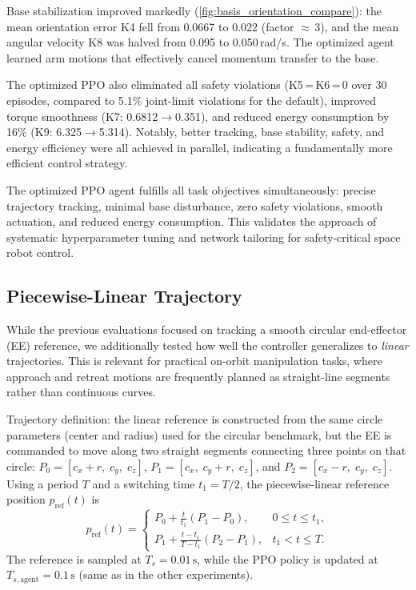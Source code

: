 \documentclass{ieeeaccess}
\begin{document}
Base stabilization improved markedly (\autoref{fig:basis_orientation_compare}): the mean orientation error K4 fell from 0.0667 to 0.022 (factor $\approx$\,3), 
and the mean angular velocity K8 was halved from 0.095 to 0.050\,rad/s. The optimized agent learned arm motions that effectively cancel momentum transfer to the base.

The optimized PPO also eliminated all safety violations (K5\,=\,K6\,=\,0 over 30 episodes, compared to 5.1\% joint-limit violations for the default), 
improved torque smoothness (K7: 0.6812$\to$0.351), and reduced energy consumption by 16\% (K9: 6.325$\to$5.314). Notably, better tracking, base stability, safety, 
and energy efficiency were all achieved in parallel, indicating a fundamentally more efficient control strategy.

The optimized PPO agent fulfills all task objectives simultaneously: precise trajectory tracking, minimal base disturbance, zero safety violations, 
smooth actuation, and reduced energy consumption. This validates the approach of systematic hyperparameter tuning and network tailoring for safety-critical space robot control.

\subsection{Piecewise-Linear Trajectory}
While the previous evaluations focused on tracking a smooth circular end-effector (EE) reference, we 
additionally tested how well the controller generalizes to \emph{linear} trajectories.
This is relevant for practical on-orbit manipulation tasks, where approach and retreat motions are frequently 
planned as straight-line segments rather than continuous curves.

\noindent
Trajectory definition: the linear reference is constructed from the same circle parameters (center and radius) used 
for the circular benchmark, but the EE is commanded to move along two straight segments connecting three points on that circle:
$P_0=[c_x+r,\;c_y,\;c_z]$, $P_1=[c_x,\;c_y+r,\;c_z]$, and $P_2=[c_x-r,\;c_y,\;c_z]$.
Using a period $T$ and a switching time $t_1=T/2$, the piecewise-linear reference position $p_{\mathrm{ref}}(t)$ is
\begin{equation}
p_{\mathrm{ref}}(t)=
\begin{cases}
P_0 + \frac{t}{t_1}\left(P_1-P_0\right), & 0\leq t\leq t_1,\\[2mm]
P_1 + \frac{t-t_1}{T-t_1}\left(P_2-P_1\right), & t_1 < t \leq T.
\end{cases}
\label{eq:linear_traj}
\end{equation}
The reference is sampled at $T_s=0.01\,\mathrm{s}$, while the PPO policy is updated at 
$T_{s,\mathrm{agent}}=0.1\,\mathrm{s}$ (same as in the other experiments).
\end{document}

